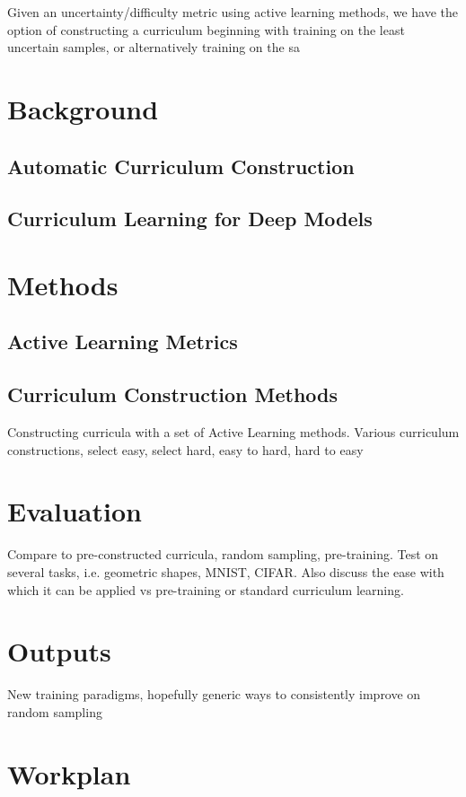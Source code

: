 \documentclass[a4paper,11pt]{article}
\begin{document}
Given an uncertainty/difficulty metric using active learning methods, we have the option of constructing a curriculum beginning with training on the least uncertain samples, or alternatively training on the sa 

\section{Background}
\subsection{Automatic Curriculum Construction}

\subsection{Curriculum Learning for Deep Models}

\section{Methods}
\subsection{Active Learning Metrics}

\subsection{Curriculum Construction Methods}


Constructing curricula with a set of Active Learning methods. 
Various curriculum constructions, select easy, select hard, easy to hard, hard to easy

\section{Evaluation}
Compare to pre-constructed curricula, random sampling, pre-training.
Test on several tasks, i.e. geometric shapes, MNIST, CIFAR.
Also discuss the ease with which it can be applied vs pre-training or standard curriculum learning.

\section{Outputs}
New training paradigms, hopefully generic ways to consistently improve on random sampling

\section{Workplan}
\end{document}
